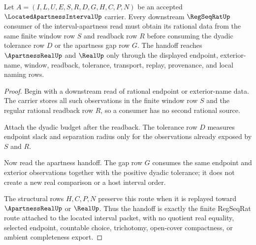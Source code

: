 \begin{theorem}
\label{thm:located-apartness-interval-regseqrat-handoff}
Let $A=(I,L,U,E,S,R,D,G,H,C,P,N)$ be an accepted $\LocatedApartnessIntervalUp$ carrier. Every downstream $\RegSeqRatUp$ consumer of the interval-apartness read must obtain its rational data from the same finite window row $S$ and readback row $R$ before consuming the dyadic tolerance row $D$ or the apartness gap row $G$. The handoff reaches $\ApartnessRealUp$ and $\RealUp$ only through the displayed endpoint, exterior-name, window, readback, tolerance, transport, replay, provenance, and local naming rows.
\end{theorem}
\begin{proof}
Begin with a downstream read of rational endpoint or exterior-name data. The carrier stores all such observations in the finite window row $S$ and the regular rational readback row $R$, so a consumer has no second rational source.

Attach the dyadic budget after the readback. The tolerance row $D$ measures endpoint slack and separation radius only for the observations already exposed by $S$ and $R$.

Now read the apartness handoff. The gap row $G$ consumes the same endpoint and exterior observations together with the positive dyadic tolerance; it does not create a new real comparison or a host interval order.

The structural rows $H,C,P,N$ preserve this route when it is replayed toward $\ApartnessRealUp$ or $\RealUp$. Thus the handoff is exactly the finite RegSeqRat route attached to the located interval packet, with no quotient real equality, selected endpoint, countable choice, trichotomy, open-cover compactness, or ambient completeness export.
\end{proof}


